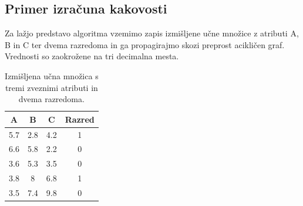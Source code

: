 \documentclass[a4paper,12pt,openright]{book}
\begin{document}
    \newpage

    \subsection{Primer izračuna kakovosti}\label{subsec:primer-izracuna-kakovosti}
    Za lažjo predstavo algoritma vzemimo zapis izmišljene učne množice z atributi A, B in C ter dvema razredoma in ga propagirajmo skozi preprost acikličen graf.
    Vrednosti so zaokrožene na tri decimalna mesta.
    \begin{table}[H]
        \centering
        \begin{tabular}{||c c c c||}
            \hline
            A & B & C & Razred \\ [0.5ex]
            \hline
            5.7 & 2.8 & 4.2 & 1 \\
            \hline
            6.6 & 5.8 & 2.2 & 0 \\
            \hline
            3.6 & 5.3 & 3.5 & 0 \\
            \hline
            3.8 & 8 & 6.8 & 1 \\
            \hline
            3.5 & 7.4 & 9.8 & 0 \\
            \hline
        \end{tabular}
        \caption{Izmišljena učna množica s tremi zveznimi atributi in dvema razredoma.}
        \label{tab:izracun_kakovosti_ucna_mnozica}
    \end{table}
\end{document}
